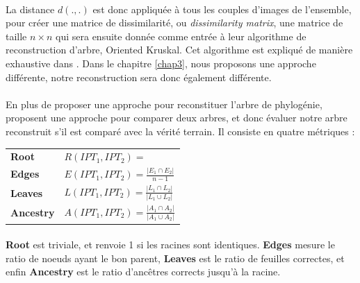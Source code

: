 \documentclass[utf8,final]{stageM2R} %
\begin{document}
\paragraph{}

La distance $d(.,.)$ est donc appliquée à tous les couples d'images de l'ensemble, pour créer une matrice de dissimilarité, ou \textit{dissimilarity matrix}, une matrice de taille $n\times n$ qui sera ensuite donnée comme entrée à leur algorithme de reconstruction d'arbre, Oriented Kruskal. Cet algorithme est expliqué de manière exhaustive dans \autocite{dias2012image}. Dans le chapitre \ref{chap3}, nous proposons une approche différente, notre reconstruction sera donc également différente. 
\paragraph{}                    

En plus de proposer une approche pour reconstituer l'arbre de phylogénie,  proposent une approche pour comparer deux arbres, et donc évaluer notre arbre reconstruit s'il est comparé avec la vérité terrain. Il consiste en quatre métriques : \\
\renewcommand{\arraystretch}{2}
\begin{tabular}{ll}
  \textbf{Root} & $
                  R(IPT_{1}, IPT_{2}) = $
                  \scalebox{0.65}{%
                  $
                  \begin{cases}
                    1 & if\ \texttt{Root(IPT}_{1}) = \texttt{Root(IPT}_{2}) \\
                    0 & Otherwise
                  \end{cases}
                        $} \\
  \textbf{Edges} & $E(IPT_{1}, IPT_{2}) = \frac{|E_{1} \cap E_{2}|} {n - 1}$ \\
  \textbf{Leaves} & $L(IPT_{1}, IPT_{2}) = \frac{|L_{1} \cap L_{2}|} {|L_{1} \cup L_{2}|}$ \\
  \textbf{Ancestry} & $A(IPT_{1}, IPT_{2}) = \frac{|A_{1} \cap A_{2}|} {|A_{1} \cup A_{2}|}$
\end{tabular}
\renewcommand{\arraystretch}{1.}
\paragraph{}

\textbf{Root} est triviale, et renvoie 1 si les racines sont identiques. \textbf{Edges} mesure le ratio de noeuds ayant le bon parent, \textbf{Leaves} est le ratio de feuilles correctes, et enfin \textbf{Ancestry} est le ratio d'ancêtres corrects jusqu'à la racine.
\end{document}
